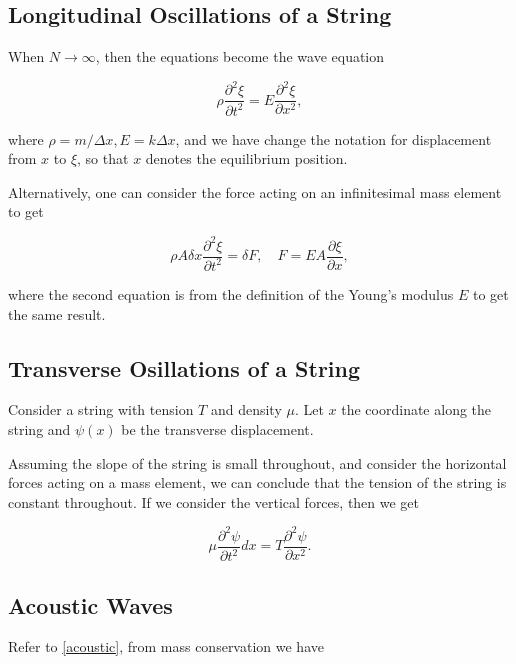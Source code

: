 \documentclass[a4paper,12pt]{report}
\begin{document}
\subsection{Longitudinal Oscillations of a String}

When \(N \to \infty\), then the equations become the wave equation 

\begin{equation}
	\rho \frac{\partial^2 \xi }{\partial t^2} = E \frac{\partial^2 \xi }{\partial x^2},   
\end{equation}

where \(\rho = m /\Delta x, E = k \Delta x \), and we have change the notation for displacement from \(x\) to \(\xi \), so that \(x\) denotes the equilibrium position.   

Alternatively, one can consider the force acting on an infinitesimal mass element to get 

\begin{equation}
	\rho A \delta x \frac{\partial^2 \xi }{\partial t^2} = \delta F , \quad F = EA \frac{\partial \xi }{\partial x}, 
\end{equation}

where the second equation is from the definition of the Young's modulus \(E\) to get the same result.


\subsection{Transverse Osillations of a String}

Consider a string with tension \(T\) and density \(\mu \). Let \(x\) the coordinate along the string and \(\psi (x)\) be the transverse displacement.

Assuming the slope of the string is small throughout, and consider the horizontal forces acting on a mass element, we can conclude that the tension of the string is constant throughout. If we consider the vertical forces, then we get

\begin{equation}
    \mu \frac{\partial ^2\psi }{\partial t^2}dx = T \frac{\partial ^2\psi }{\partial x^2}.   
\end{equation}

\subsection{Acoustic Waves}

Refer to \cref{acoustic}, from mass conservation we have
\end{document}
